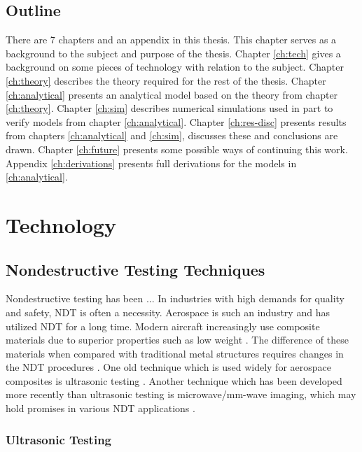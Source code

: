 \documentclass[11pt,twoside]{eitExjobb}
\begin{document}
	\section{Outline}
	There are 7 chapters and an appendix in this thesis. This chapter serves as a background to the subject and purpose of the thesis. Chapter \ref{ch:tech} gives a background on some pieces of technology with relation to the subject. Chapter \ref{ch:theory} describes the theory required for the rest of the thesis. Chapter \ref{ch:analytical} presents an analytical model based on the theory from chapter \ref{ch:theory}. Chapter \ref{ch:sim} describes numerical simulations used in part to verify models from chapter \ref{ch:analytical}. Chapter \ref{ch:res-disc} presents results from chapters \ref{ch:analytical} and \ref{ch:sim}, discusses these and conclusions are drawn. Chapter \ref{ch:future} presents some possible ways of continuing this work. Appendix \ref{ch:derivations} presents full derivations for the models in \ref{ch:analytical}.
	
	\chapter{Technology \label{ch:tech}}
	
	\section{Nondestructive Testing Techniques}
	Nondestructive testing has been ... In industries with high demands for quality and safety, NDT is often a necessity. Aerospace is such an industry and has utilized NDT for a long time. \addref Modern aircraft increasingly use composite materials due to superior properties such as low weight \cite{Katunin2015}. The difference of these materials when compared with traditional metal structures requires changes in the NDT procedures \cite{Riegert2006}. One old technique which is used widely for aerospace composites is ultrasonic testing \cite{Garnier2011}. Another technique which has been developed more recently than ultrasonic testing is microwave/mm-wave imaging, which may hold promises in various NDT applications \cite{Kharkovsky2007}.
	
	\subsection{Ultrasonic Testing}
	
\end{document}
